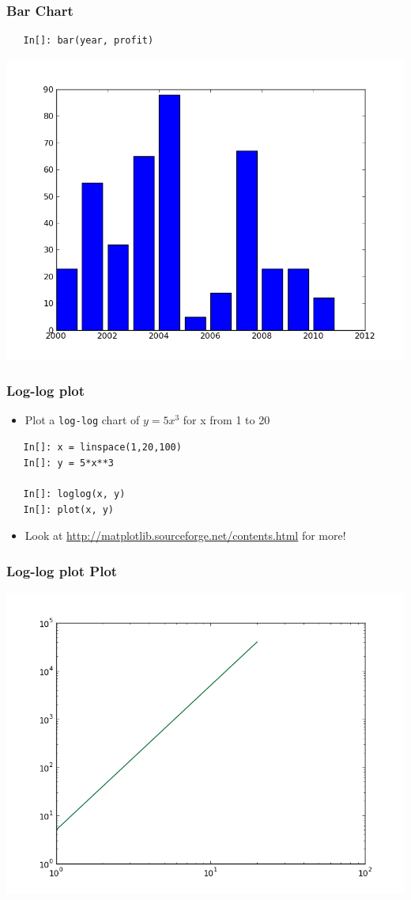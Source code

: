 \begin{frame}[fragile]
  \frametitle{Bar Chart}
  \begin{lstlisting}
   In[]: bar(year, profit)
  \end{lstlisting}
\includegraphics[scale=0.35]{../advanced_python/images/bar.png}\\
\end{frame}

\begin{frame}[fragile]
  \frametitle{Log-log plot}
  \begin{itemize}
  \item Plot a \texttt{log-log} chart of $y=5x^3$ for x from 1 to 20
  \end{itemize}
  \begin{lstlisting}
   In[]: x = linspace(1,20,100)
   In[]: y = 5*x**3

   In[]: loglog(x, y)
   In[]: plot(x, y)
  \end{lstlisting}
  \begin{itemize}
  \item Look at \url{http://matplotlib.sourceforge.net/contents.html}
    for more!
  \end{itemize}
\end{frame}

\begin{frame}
\frametitle{Log-log plot Plot}
\includegraphics[scale=0.45]{../advanced_python/images/loglog.png}\\
\end{frame}


